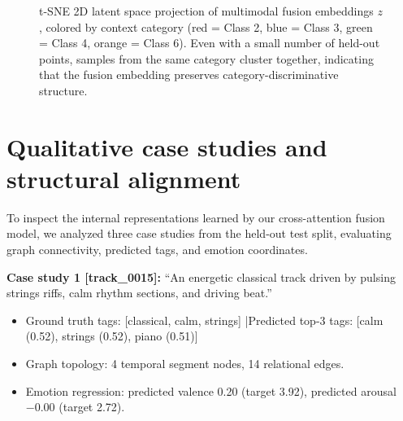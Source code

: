 \documentclass[10pt]{article}
\begin{document}
\begin{figure}[t]
  \centering
  \caption{t-SNE 2D latent space projection of multimodal fusion embeddings $z$, colored by context category (red = Class 2, blue = Class 3, green = Class 4, orange = Class 6). Even with a small number of held-out points, samples from the same category cluster together, indicating that the fusion embedding preserves category-discriminative structure.}
  \label{fig:tsne}
\end{figure}

\section{Qualitative case studies and structural alignment}

To inspect the internal representations learned by our cross-attention fusion model, we analyzed three case studies from the held-out test split, evaluating graph connectivity, predicted tags, and emotion coordinates.

\textbf{Case study 1 [track\_0015]:} ``An energetic classical track driven by pulsing strings riffs, calm rhythm sections, and driving beat.''
\begin{itemize}[nosep]
  \item Ground truth tags: [classical, calm, strings] \quad|\quad Predicted top-3 tags: [calm (0.52), strings (0.52), piano (0.51)]
  \item Graph topology: 4 temporal segment nodes, 14 relational edges.
  \item Emotion regression: predicted valence 0.20 (target 3.92), predicted arousal $-0.00$ (target 2.72).
\end{itemize}
\end{document}
